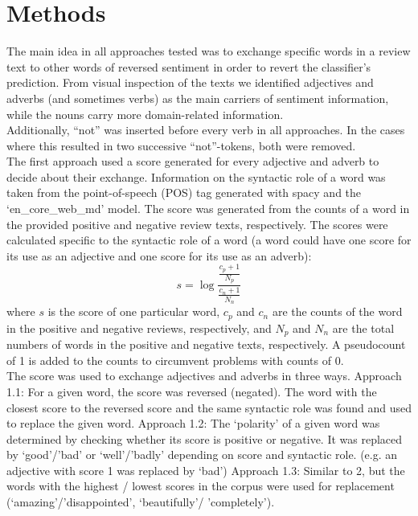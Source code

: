 \documentclass[11pt,a4paper]{article}
\begin{document}
\section{Methods}
The main idea in all approaches tested was to exchange specific words in a review text to other words of reversed sentiment in order to revert the classifier’s prediction. From visual inspection of the texts we identified adjectives and adverbs (and sometimes verbs) as the main carriers of sentiment information, while the nouns carry more domain-related information.\\
Additionally, “not” was inserted before every verb in all approaches. In the cases where this resulted in two successive “not”-tokens, both were removed.\\
The first approach used a score generated for every adjective and adverb to decide about their exchange. Information on the syntactic role of a word was taken from the point-of-speech (POS) tag generated with spacy and the ‘en\_core\_web\_md’ model. The score was generated from the counts of a word in the provided positive and negative review texts, respectively. The scores were calculated specific to the syntactic role of a word (a word could have one score for its use as an adjective and one score for its use as an adverb):\\
\begin{equation}
s=\log\frac{\frac{c_p+1}{N_p}}{\frac{c_n+1}{N_n}}
\end{equation}
where $s$ is the score of one particular word, $c_p$  and $c_n$ are the counts of the word in the positive and negative reviews, respectively, and $N_p$ and $N_n$ are the total numbers of words in the positive and negative texts, respectively. A pseudocount of 1 is added to the counts to circumvent problems with counts of 0.\\
The score was used to exchange adjectives and adverbs in three ways. Approach 1.1: For a given word, the score was reversed (negated). The word with the closest score to the reversed score and the same syntactic role was found and used to replace the given word. Approach 1.2: The ‘polarity’ of a given word was determined by checking whether its score is positive or negative. It was replaced by ‘good’/’bad’ or ‘well’/’badly’ depending on score and syntactic role. (e.g. an adjective with score 1 was replaced by ‘bad’) Approach 1.3: Similar to 2, but the words with the highest / lowest scores in the corpus were used for replacement (‘amazing’/’disappointed’, ‘beautifully’/ ’completely’).\\
\end{document}
